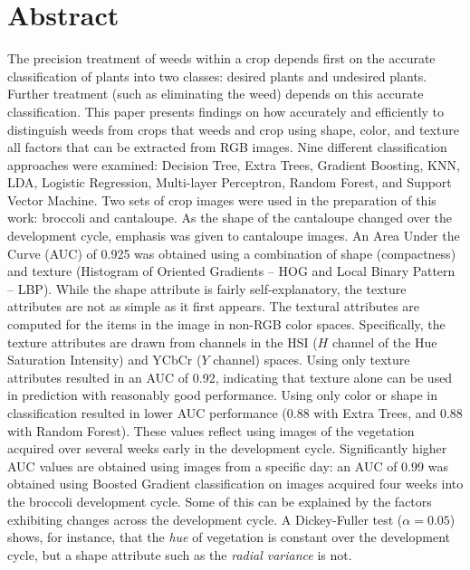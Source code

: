 \documentclass[letterpaper]{report}
\begin{document}
\section*{Abstract}
The precision treatment of weeds within a crop depends first on the accurate classification of plants into two classes: desired plants and undesired plants. Further treatment (such as eliminating the weed) depends on this accurate classification. This paper presents findings on how accurately and efficiently to distinguish weeds from crops that weeds and crop using shape, color, and texture all factors that can be extracted from RGB images.  Nine different classification approaches were examined: Decision Tree, Extra Trees, Gradient Boosting, \gls{KNN}, \gls{LDA}, Logistic Regression, Multi-layer Perceptron, Random Forest, and Support Vector Machine. Two sets of crop images were used in the preparation of this work: broccoli and cantaloupe. As the shape of the cantaloupe changed over the development cycle, emphasis was given to cantaloupe images. An Area Under the Curve (\gls{AUC}) of 0.925 was obtained using a combination of shape (compactness) and texture (Histogram of Oriented Gradients -- \gls{HOG} and Local Binary Pattern -- \gls{LBP}).  While the shape attribute is fairly self-explanatory, the texture attributes are not as simple as it first appears. The textural attributes are computed for the items in the image in non-RGB color spaces. Specifically, the texture attributes are drawn from channels in the \gls{HSI} ($H$ channel of the Hue Saturation Intensity) and YCbCr ($Y$ channel) spaces. Using only texture attributes resulted in an AUC of 0.92, indicating that texture alone can be used in prediction with reasonably good performance. Using only color or shape in classification resulted in lower AUC performance ($0.88$ with Extra Trees, and $0.88$ with Random Forest). These values reflect using images of the vegetation acquired over several weeks early in the development cycle. Significantly higher AUC values are obtained using images from a specific day: an AUC of 0.99 was obtained using Boosted Gradient classification on images acquired four weeks into the broccoli development cycle. Some of this can be explained by the factors exhibiting changes across the development cycle. A Dickey-Fuller test ($\alpha = 0.05$) shows, for instance, that the \textit{hue} of vegetation is constant over the development cycle, but a shape attribute such as the \textit{radial variance} is not.
\end{document}
